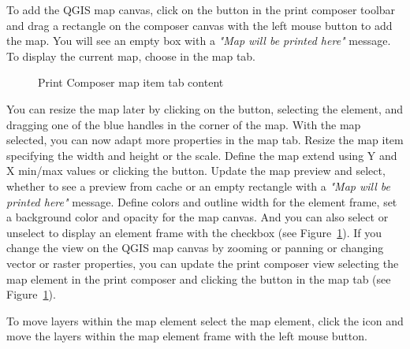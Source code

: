 To add the QGIS map canvas, click on the  button in the print composer toolbar and drag a 
rectangle on the composer canvas with the left mouse button to add the map. 
You will see an empty box with a \textit{"Map will be printed here"} message.
To display the current map, choose  in the map  tab.

\begin{figure}[ht]
\centering
\caption{Print Composer map item tab content \nixcaption}\label{fig:print_composer_map_item}
   \goodgap
\end{figure}

You can resize the map later by clicking on the  
button, selecting the element, and dragging one of the blue handles in the corner of the map. With the 
map selected, you can now adapt more properties in the map  tab. Resize the map 
item specifying the width and height or the scale. Define the map extend using Y and 
X min/max values or clicking the  button. Update the 
map preview and select, whether to see a preview from cache or an empty rectangle with 
a \textit{"Map will be printed here"} message. Define colors and outline width for the 
element frame, set a background color and opacity for the map canvas. And you can also 
select or unselect to display an element frame with the  checkbox 
(see Figure~\ref{fig:print_composer_map_item}). If you change the view on the QGIS 
map canvas by zooming or panning or changing vector or raster properties, you can 
update the print composer view selecting the map element in the print composer and clicking 
the  button in the map  tab 
(see Figure~\ref{fig:print_composer_map_item}). 

To move layers within the map element select the map element, click 
the  icon 
and move the layers within the map element frame with the left mouse button.

\begin{Tip}\caption{\textsc{Saving a print composer layout}}
\end{Tip} 

